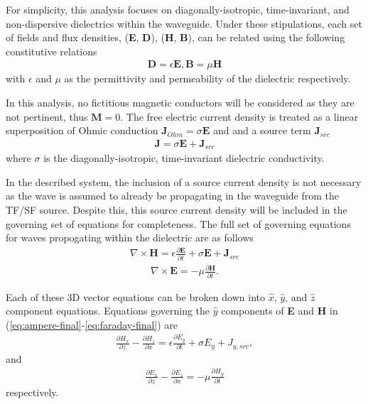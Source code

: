 For simplicity, this analysis focuses on diagonally-isotropic, time-invariant, and non-dispersive dielectrics within the waveguide. Under these stipulations, each set of fields and flux densities, (\textbf{E}, \textbf{D}), (\textbf{H}, \textbf{B}), can be related using the following constitutive relations
\begin{align}
	\textbf{D}=\epsilon\textbf{E}, \textbf{B}=\mu\textbf{H}
	\label{eq:cor}
\end{align}
with $\epsilon$ and $\mu$ as the permittivity and permeability of the dielectric respectively.

In this analysis, no fictitious magnetic conductors will be considered as they are not pertinent, thus $\textbf{M} = 0$. The free electric current density is treated as a linear superposition of Ohmic conduction $\textbf{J}_{Ohm}=\sigma\textbf{E}$ and and a source term $\textbf{J}_{src}$
\begin{align}
	\textbf{J} = \sigma\textbf{E} + \textbf{J}_{src}
	\label{eq:current}
\end{align}
where $\sigma$ is the diagonally-isotropic, time-invariant dielectric conductivity. 

In the described system, the inclusion of a source current density is not necessary as the wave is assumed to already be propagating in the waveguide from the TF/SF source. Despite this, this source current density will be included in the governing set of equations for completeness. The full set of governing equations for waves propogating within the dielectric are as follows
\begin{align}
    \nabla\times\textbf{H} = \epsilon\frac{\partial\textbf{E}}{\partial t} + \sigma\textbf{E} + \textbf{J}_{src}
    \label{eq:ampere-final}
\end{align}
\begin{align}
    \nabla\times\textbf{E}=-\mu\frac{\partial\textbf{H}}{\partial t}.
    \label{eq:faraday-final}
\end{align}

Each of these 3D vector equations can be broken down into $\hat{x}$, $\hat{y}$, and $\hat{z}$ component equations. Equations governing the $\hat{y}$ components of \textbf{E} and \textbf{H} in  (\ref{eq:ampere-final}-\ref{eq:faraday-final}) are
\begin{align}
	\frac{\partial H_x}{\partial z} - \frac{\partial H_z}{\partial x} = \epsilon\frac{\partial E_y}{\partial t} + \sigma E_y + J_{y,src},
	\label{ampere-full-ey}
\end{align}
and
\begin{align}
	\frac{\partial E_x}{\partial z} - \frac{\partial E_z}{\partial x} =-\mu\frac{\partial H_y}{\partial t}
	\label{faraday-full-hy}
\end{align}
respectively.

